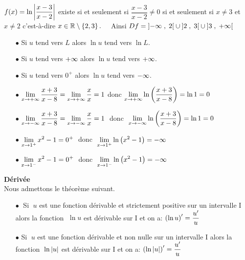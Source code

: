 \begin{example}

$ f(x)=\ln \left\lvert \dfrac{x-3}{x-2} \right\rvert $  existe  si et seulement si $ \dfrac{x-3}{x-2}\neq 0 $ si et seulement si $ x\neq3 $  et $ x\neq2 $ c'est-à-dire $ x\in\mathbb{R}\setminus \left\{2,3\right\}.\quad  $ Ainsi 
$ Df=\left]-\infty \;,\; 2\right[\cup \left]2 \;,\; 3\right[\cup\left]3 \;,\; +\infty\right[$
\end{example}

\begin{property}[Limites]
\begin{itemize}
\item[$ \bullet $]  Si $ u  $ tend vers \textbf{$ L $}  alors $ \ln u $  tend vers \textbf{$\ln L$}. 
\item[$ \bullet $]  Si $ u  $ tend vers $ +\infty $  alors $ \ln u $  tend vers $ +\infty $.
\item[$ \bullet $]  Si $ u  $ tend vers $ 0^{+} $  alors $ \ln u $  tend vers $ -\infty $.

\end{itemize}
\end{property}

\begin{example}
\begin{itemize}
\item[$ \bullet $] $ \displaystyle \lim_{x\to +\infty}\frac{x+3}{x-8}=\displaystyle \lim_{x\to +\infty}\frac{x}{x}=1 $ donc $ \displaystyle \lim_{x\to +\infty}\ln\left(\frac{x+3}{x-8}\right)=\ln 1=0$


\item[$ \bullet $] $ \displaystyle \lim_{x\to -\infty}\dfrac{x+3}{x-8}=\displaystyle \lim_{x\to -\infty}\dfrac{x}{x}=1 \;$ donc $ \;\displaystyle \lim_{x\to -\infty}\ln\left(\dfrac{x+3}{x-8}\right)=\ln 1=0$



 \item[$ \bullet $]  $ \displaystyle \lim_{x\to 1^{+}}x^{2}-1=0^{+}\; $ donc $\; \displaystyle \lim_{x\to 1^{+}}\ln\left(x^{2}-1\right)=-\infty$
 
\item[$ \bullet $] $ \displaystyle \lim_{x\to 1^{-}}x^{2}-1=0^{+}\; $ donc $\; \displaystyle \lim_{x\to 1^{-}}\ln\left(x^{2}-1\right)=-\infty$
\end{itemize}
\end{example}

\textbf{Dérivée}\\
Nous admettons le théorème suivant.
\begin{theorem}
\begin{itemize}
\item[$ \bullet \;$] Si  $\; u $  est  une fonction dérivable et strictement positive sur un intervalle I alors la fonction  $ \; \ln u $ est dérivable sur I et on a:  $ \left(\ln u\right)^{\prime}=\dfrac{u^{\prime}}{u} $
\item[$ \bullet $] Si  $ \; u $  est  une fonction dérivable et non nulle sur un intervalle I alors la fonction  $\;  \ln \left\lvert u \right\rvert $ est dérivable sur I et on a:  $ \left(\ln \left\lvert u \right\rvert\right)^{\prime}=\dfrac{u^{\prime}}{u} $
\end{itemize}
\end{theorem}

